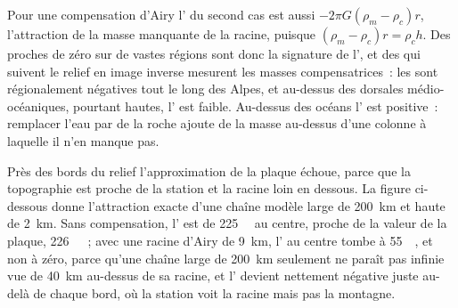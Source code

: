 Pour une compensation d'Airy l' du second cas est aussi
$-2\pi G(\rho_m - \rho_c)r$, l'attraction de la masse manquante de la racine,
puisque $(\rho_m - \rho_c)r = \rho_c h$. Des  proches de zéro
sur de vastes régions sont donc la signature de l', et des  qui suivent le relief en image inverse mesurent les masses compensatrices~:
les  sont régionalement négatives tout le long des Alpes, et
au-dessus des dorsales médio-océaniques, pourtant hautes, l'
est faible. Au-dessus des océans l' est positive~: remplacer l'eau
par de la roche ajoute de la masse au-dessus d'une colonne à laquelle il n'en manque
pas.

Près des bords du relief l'approximation de la plaque échoue, parce que la
topographie est proche de la station et la racine loin en dessous. La figure
ci-dessous donne l'attraction exacte d'une chaîne modèle large de \qty{200}{km} et
haute de \qty{2}{km}. Sans compensation, l' est de
\qty{+225}{\milli\gal} au centre, proche de la valeur de la plaque,
\qty{226}{\milli\gal}~; avec une racine d'Airy de \qty{9}{km}, l'
au centre tombe à \qty{+55}{\milli\gal}, et non à zéro, parce qu'une chaîne large de
\qty{200}{km} seulement ne paraît pas infinie vue de \qty{40}{km} au-dessus de sa
racine, et l' devient nettement négative juste au-delà de
chaque bord, où la station voit la racine mais pas la montagne.

